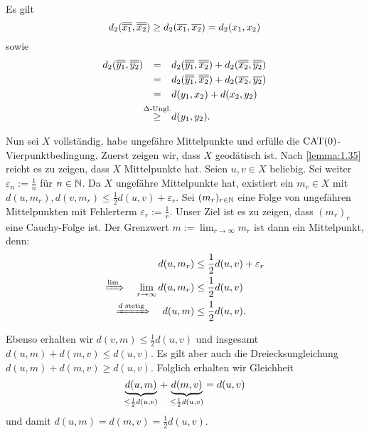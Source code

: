 \begin{beweis}
\begin{description}
\begin{description}
		Es gilt
		\[
			d_2(\overline{\overline{x_1}},\overline{\overline{x_2}}) \geq d_2(\overline{x_1},\overline{x_2}) = d_2(x_1,x_2)
		\]
		sowie
		\begin{align*}
			d_2(\ol{\ol{y_1}},\ol{\ol{y_2}}) &\stack{}{=} d_2(\ol{\ol{y_1}},\ol{\ol{x_2}}) + d_2(\ol{\ol{x_2}},\ol{\ol{y_2}}) \\
			&\stack{}{=} d_2(\ol{\ol{y_1}},\ol{\ol{x_2}}) + d_2(\ol{x_2},\ol{y_2}) \\
			&\stack{}{=} d(y_1,x_2) + d(x_2,y_2) \\
			&\stack{\Delta\text{-Ungl.}}{\geq} d(y_1,y_2).
		\end{align*}
	\end{description}
	\item[\bewrueck] Nun sei $X$ vollständig, habe ungefähre Mittelpunkte und erfülle die $\operatorname{CAT(0)}$-Vierpunktbedingung. 
	Zuerst zeigen wir, dass $X$ geodätisch ist.
	Nach \autoref{lemma:1.35} reicht es zu zeigen, dass $X$ Mittelpunkte hat.
	Seien $u,v \in X$ beliebig.
	Sei weiter $\varepsilon_n := \frac{1}{n}$ für $n \in \mathbb{N}$.
	Da $X$ ungefähre Mittelpunkte hat, existiert ein $m_r \in X$ mit $d(u,m_r), d(v,m_r) \leq \frac{1}{2} d(u,v) + \varepsilon_r$.
	Sei $(m_r)_{r \in \mathbb{N}}$ eine Folge von ungefähren Mittelpunkten mit Fehlerterm $\varepsilon_r := \frac{1}{r}$.
	Unser Ziel ist es zu zeigen, dass $(m_r)_{r}$ eine Cauchy-Folge ist.
	Der Grenzwert $m := \lim_{r \rightarrow \infty} m_r$ ist dann ein Mittelpunkt, denn:
	\begin{align*}
		d(u,m_r) &\leq \frac{1}{2} d(u,v) + \varepsilon_r \\
		\xRightarrow{\lim} \quad \lim\limits_{r \rightarrow \infty} d(u,m_r) &\leq \frac{1}{2} d(u,v) \\
		\xRightarrow{d \text{ stetig}} \quad d(u,m) &\leq \frac{1}{2} d(u,v).
	\end{align*}

	Ebenso erhalten wir $d(v,m) \leq \frac{1}{2} d(u,v)$ und insgesamt $d(u,m) + d(m,v) \leq d(u,v)$. Es gilt aber auch die Dreiecksungleichung $d(u,m) + d(m,v) \geq d(u,v)$. Folglich erhalten wir Gleichheit
	\[
		{\underbrace{d(u,m)}_{\leq \frac{1}{2} d(u,v)}} + {\underbrace{d(m,v)}_{\leq \frac{1}{2} d(u,v)}} = d(u,v)
	\]
	und damit $d(u,m) = d(m,v) = \frac{1}{2} d(u,v)$.
	

\end{description}
\end{beweis}
